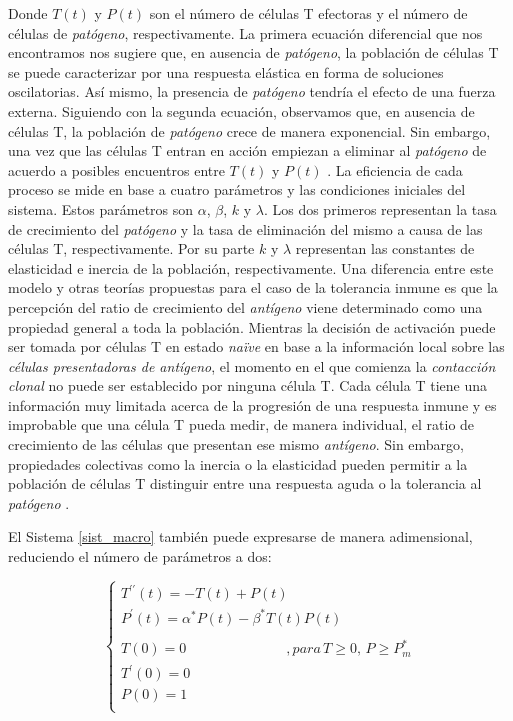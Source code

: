Donde $T(t)$ y $P(t)$ son el número de células T efectoras y el número de células de \textit{patógeno}, respectivamente. La primera ecuación diferencial que nos encontramos nos sugiere que, en ausencia de \textit{patógeno}, la población de células T se puede caracterizar por una respuesta elástica en forma de soluciones oscilatorias. Así mismo, la presencia de \textit{patógeno} tendría el efecto de una fuerza externa. Siguiendo con la segunda ecuación, observamos que, en ausencia de células T, la población de \textit{patógeno} crece de manera exponencial. Sin embargo, una vez que las células T entran en acción empiezan a eliminar al \textit{patógeno} de acuerdo a posibles encuentros entre $T(t)$ y $P(t)$ \citep{arias2016emergent}. La eficiencia de cada proceso se mide en base a cuatro parámetros y las condiciones iniciales del sistema. Estos parámetros son $\alpha$, $\beta$, $k$ y $\lambda$. Los dos primeros representan la tasa de crecimiento del \textit{patógeno} y la tasa de eliminación del mismo a causa de las células T, respectivamente. Por su parte $k$ y $\lambda$ representan las constantes de elasticidad e inercia de la población, respectivamente. Una diferencia entre este modelo y otras teorías propuestas para el caso de la tolerancia inmune es que la percepción del ratio de crecimiento del \textit{antígeno} viene determinado como una propiedad general a toda la población. Mientras la decisión de activación puede ser tomada por células T en estado \textit{naïve} en base a la información local sobre las \textit{células presentadoras de antígeno}, el momento en el que comienza la \textit{contacción clonal} no puede ser establecido por ninguna célula T. Cada célula T tiene una información muy limitada acerca de la progresión de una respuesta inmune y es improbable que una célula T pueda medir, de manera individual, el ratio de crecimiento de las células que presentan ese mismo \textit{antígeno}. Sin embargo, propiedades colectivas como la inercia o la elasticidad pueden permitir a la población de células T distinguir entre una respuesta aguda o la tolerancia al \textit{patógeno} \citep{arias2015growth}.

El Sistema \ref{sist_macro} también puede expresarse de manera adimensional, reduciendo el número de parámetros a dos: 

\begin{equation}
	\label{sist_macro_nod}
	\left\{ \begin{array}{l}
	{T^{\prime\prime}}(t) = -T(t) + P(t) \\
	{P^{\prime}}(t) = \alpha^{*} P(t) - \beta^{*} T(t)P(t) \\
	\\
	T(0)=0 \hspace{3cm} ,para\, T \geq 0,\, P \geq P_m^{*} \\
	T^{\prime}(0)=0  \\
	P(0)=1 \\ 
	\end{array}
	\right.
\end{equation}

